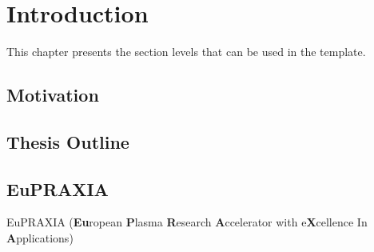 \chapter{Introduction}
This chapter presents the section levels that can be used in the template. 

\section{Motivation}
\section{Thesis Outline}
\section{EuPRAXIA}
EuPRAXIA (\textbf{Eu}ropean \textbf{P}lasma \textbf{R}esearch \textbf{A}ccelerator with e\textbf{X}cellence In \textbf{A}pplications)


